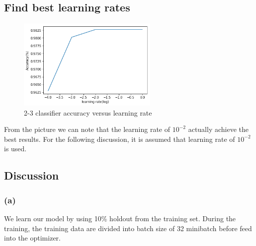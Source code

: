 \documentclass{article}
\begin{document}
\subsection{Find best learning rates}
\begin{figure}[h]
	\centering
	\includegraphics[width=0.6\textwidth]{pics/learning_rate.png}
	\caption{2-3 classifier accuracy versus learning rate}
\end{figure}

From the picture we can note that the learning rate of $10^{-2}$ actually achieve the best results.  For the following discussion, it is assumed that learning rate of $10^{-2}$ is used.

\subsection{Discussion}
\subsubsection*{(a)}
We learn our model by using 10\% holdout from the training set. During the training, the training data are divided into batch size of 32 minibatch before feed into the optimizer. 
\end{document}

